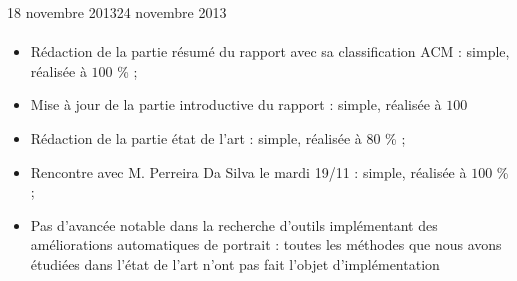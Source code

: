 \documentclass[11pt, french]{report-rd-info}
\begin{document}
\begin{fichesuivi}{18 novembre 2013}{24 novembre 2013}

\paragraph{}
	\begin{travaileffectue}
		\begin{itemize}
			\item Rédaction de la partie résumé du rapport avec sa classification ACM : simple, réalisée à $100$ \% ;
			\item Mise à jour de la partie introductive du rapport : simple, réalisée à $100$%
			\item Rédaction de la partie état de l’art : simple, réalisée à $80$ \% ;
			\item Rencontre avec M. Perreira Da Silva le mardi 19/11 : simple, réalisée à $100$ \% ;
		\end{itemize}
	\end{travaileffectue}

\begin{travailnoneffectue}
		\begin{itemize}
			\item Pas d’avancée notable dans la recherche d'outils implémentant des améliorations automatiques de portrait : toutes les méthodes que nous avons étudiées dans l’état de l’art n’ont pas fait l’objet d’implémentation		\end{itemize}
	\end{travailnoneffectue}
		

\end{fichesuivi}
\end{document}
